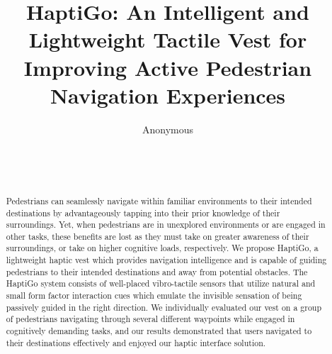 \documentclass{sigchi}
\begin{document}

\title{HaptiGo: An Intelligent and Lightweight Tactile Vest for Improving Active Pedestrian Navigation Experiences}


\author{
  \alignauthor Anonymous\\
    \\
    \\
    \\
}


\maketitle


\begin{abstract}
Pedestrians can seamlessly navigate within familiar environments to their intended destinations by advantageously tapping into their prior knowledge of their surroundings. Yet, when pedestrians are in unexplored environments or are engaged in other tasks, these benefits are lost as they must take on greater awareness of their surroundings, or take on higher cognitive loads, respectively. We propose HaptiGo, a lightweight haptic vest which provides navigation intelligence and is capable of guiding pedestrians to their intended destinations and away from potential obstacles. The HaptiGo system consists of well-placed vibro-tactile sensors that utilize natural and small form factor interaction cues which emulate the invisible sensation of being passively guided in the right direction. We individually evaluated our vest on a group of pedestrians navigating through several different waypoints while engaged in cognitively demanding tasks, and our results demonstrated that users navigated to their destinations effectively and enjoyed our haptic interface solution.
\end{abstract}


\end{document}
